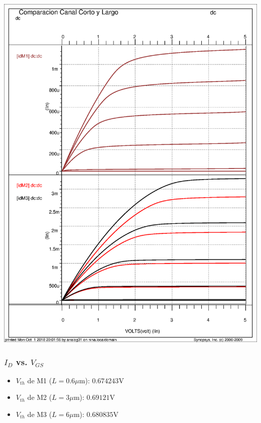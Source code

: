 \includegraphics[scale=0.7]{images/parametric}
\subsubsection{$I_D$ vs. $V_{GS}$} 
\begin{itemize}
	\item $V_{th}$ de M1 ($L=0.6\mu$m): $0.674243$V
	\item $V_{th}$ de M2 ($L=3\mu$m): $0.69121$V
	\item $V_{th}$ de M3 ($L=6\mu$m): $0.680835$V
\end{itemize}

